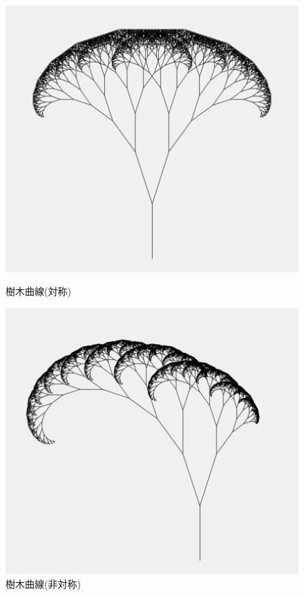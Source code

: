 \documentclass[dvipdfmx]{jsarticle}
\theoremstyle{definition}
\begin{document}
\begin{figure}[ht]
\begin{minipage}{0.5\hsize}
    \begin{center}
        \includegraphics[scale=0.20]{figure/tree_curve.png}
    \end{center}
    \caption{樹木曲線(対称)}
\end{minipage}
\begin{minipage}{0.49\hsize}
    \begin{center}
        \includegraphics[scale=0.20]{figure/tree_curve_asy.png}
    \end{center}
    \caption{樹木曲線(非対称)}
\end{minipage}
\end{figure}
\end{document}
